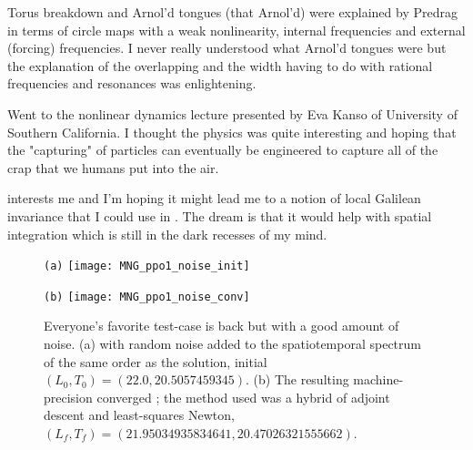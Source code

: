 \begin{description}
{\begin{description}
Torus breakdown and Arnol'd tongues (that Arnol'd) were explained by Predrag
in terms of circle maps with a weak nonlinearity, internal frequencies and external (forcing) frequencies.
I never really understood what Arnol'd tongues were but the explanation of the overlapping and the width
having to do with rational frequencies and resonances was enlightening.

\item[Cilia by Eva Kanso]
Went to the nonlinear dynamics lecture presented by Eva Kanso of University of Southern California.
I thought the physics was quite interesting and hoping that the "capturing" of particles can eventually
be engineered to capture all of the crap that we humans put into the air.

\item[EM spacetime]
 interests me and I'm hoping it might lead me to a notion of local Galilean invariance
that I could use in \KSe. The dream is that it would help with spatial integration which is still
in the dark recesses of my mind.

\end{description}
}

\begin{figure}[ht]
\begin{minipage}[height=.32\textheight]{.45\textwidth}
\centering \small{\texttt{(a)}}
\texttt{[image: MNG\_ppo1\_noise\_init]}
\end{minipage}
\begin{minipage}[height=.32\textheight]{.45\textwidth}
\centering \small{\texttt{(b)}}
\texttt{[image: MNG\_ppo1\_noise\_conv]}
\end{minipage}
\caption{ \label{fig:MNG_adjnewt_robustness}
Everyone's favorite test-case {\twot} is back but with a good
amount of noise.
(a)  with random noise added to the spatiotemporal spectrum of the same
order as the solution, initial \twot\
$(L_0,T_0)=(22.0,20.5057459345)$.
(b) The resulting machine-precision converged \twot; the
method used was a hybrid of adjoint descent and least-squares Newton,
$(L_f,T_f)=(21.95034935834641,20.47026321555662)$.
}
\end{figure}


\end{description}
